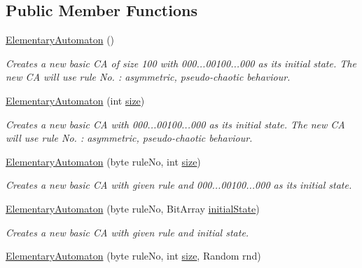 \subsection*{Public Member Functions}
\begin{DoxyCompactItemize}
\item 
\hyperlink{class_cellular_1_1_elementary_automaton_a3102fe9e27bc0b89dd69b1c8d1298594}{Elementary\+Automaton} ()
\begin{DoxyCompactList}\small\item\em Creates a new basic C\+A of size 100 with 000...00100...000 as its initial state. The new C\+A will use rule No. \+: asymmetric, pseudo-\/chaotic behaviour. \end{DoxyCompactList}\item 
\hyperlink{class_cellular_1_1_elementary_automaton_adb0c84746e3c2d1c65010f506d010e94}{Elementary\+Automaton} (int \hyperlink{class_cellular_1_1_automaton1_d_a915129ccf0f1e7092844c99ce6a28e5b}{size})
\begin{DoxyCompactList}\small\item\em Creates a new basic C\+A with 000...00100...000 as its initial state. The new C\+A will use rule No. \+: asymmetric, pseudo-\/chaotic behaviour. \end{DoxyCompactList}\item 
\hyperlink{class_cellular_1_1_elementary_automaton_aa8326e685de0a177a5125625280fdde1}{Elementary\+Automaton} (byte rule\+No, int \hyperlink{class_cellular_1_1_automaton1_d_a915129ccf0f1e7092844c99ce6a28e5b}{size})
\begin{DoxyCompactList}\small\item\em Creates a new basic C\+A with given rule and 000...00100...000 as its initial state. \end{DoxyCompactList}\item 
\hyperlink{class_cellular_1_1_elementary_automaton_aa5d649a5cc42560eede2ac3c96199f7b}{Elementary\+Automaton} (byte rule\+No, Bit\+Array \hyperlink{all__1_8js_ae8b87ff4be2ae1dd5267342795263360}{initial\+State})
\begin{DoxyCompactList}\small\item\em Creates a new basic C\+A with given rule and initial state. \end{DoxyCompactList}\item 
\hyperlink{class_cellular_1_1_elementary_automaton_a64849d809eb4962cb09b5263f3227457}{Elementary\+Automaton} (byte rule\+No, int \hyperlink{class_cellular_1_1_automaton1_d_a915129ccf0f1e7092844c99ce6a28e5b}{size}, Random rnd)

\end{DoxyCompactItemize}
